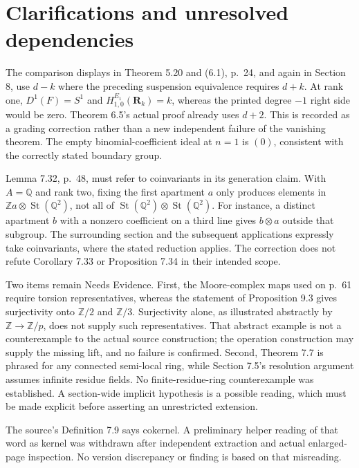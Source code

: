 \documentclass[10pt]{article}
\begin{document}
\section*{Clarifications and unresolved dependencies}
The comparison displays in Theorem 5.20 and (6.1), p. 24, and again in Section 8, use \(d-k\) where the preceding suspension equivalence requires \(d+k\). At rank one, \(D^1(F)=S^1\) and \(H^{E_1}_{1,0}(\mathbf R_k)=k\), whereas the printed degree \(-1\) right side would be zero. Theorem 6.5’s actual proof already uses \(d+2\). This is recorded as a grading correction rather than a new independent failure of the vanishing theorem. The empty binomial-coefficient ideal at \(n=1\) is \((0)\), consistent with the correctly stated boundary group.\par
Lemma 7.32, p. 48, must refer to coinvariants in its generation claim. With \(A=\mathbb Q\) and rank two, fixing the first apartment \(a\) only produces elements in \(\mathbb Za\otimes\operatorname{St}(\mathbb Q^2)\), not all of \(\operatorname{St}(\mathbb Q^2)\otimes\operatorname{St}(\mathbb Q^2)\). For instance, a distinct apartment \(b\) with a nonzero coefficient on a third line gives \(b\otimes a\) outside that subgroup. The surrounding section and the subsequent applications expressly take coinvariants, where the stated reduction applies. The correction does not refute Corollary 7.33 or Proposition 7.34 in their intended scope.\par
Two items remain Needs Evidence. First, the Moore-complex maps used on p. 61 require torsion representatives, whereas the statement of Proposition 9.3 gives surjectivity onto \(\mathbb Z/2\) and \(\mathbb Z/3\). Surjectivity alone, as illustrated abstractly by \(\mathbb Z\to\mathbb Z/p\), does not supply such representatives. That abstract example is not a counterexample to the actual source construction; the operation construction may supply the missing lift, and no failure is confirmed. Second, Theorem 7.7 is phrased for any connected semi-local ring, while Section 7.5’s resolution argument assumes infinite residue fields. No finite-residue-ring counterexample was established. A section-wide implicit hypothesis is a possible reading, which must be made explicit before asserting an unrestricted extension.\par
The source’s Definition 7.9 says cokernel. A preliminary helper reading of that word as kernel was withdrawn after independent extraction and actual enlarged-page inspection. No version discrepancy or finding is based on that misreading.\par
\end{document}
